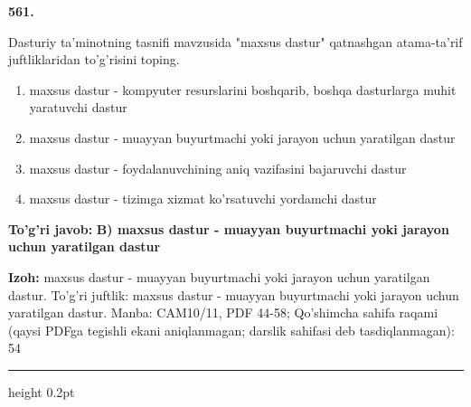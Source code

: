 \documentclass[10pt,a4paper]{article}
\begin{document}
{\bfseries\sffamily\color{ink} 561.}
\par
Dasturiy ta'minotning tasnifi mavzusida "maxsus dastur" qatnashgan atama-ta'rif juftliklaridan to'g'risini toping.
\begin{enumerate}[label=\Alph*),leftmargin=9mm]
\item maxsus dastur - kompyuter resurslarini boshqarib, boshqa dasturlarga muhit yaratuvchi dastur
\item maxsus dastur - muayyan buyurtmachi yoki jarayon uchun yaratilgan dastur
\item maxsus dastur - foydalanuvchining aniq vazifasini bajaruvchi dastur
\item maxsus dastur - tizimga xizmat ko'rsatuvchi yordamchi dastur
\end{enumerate}
\begin{tcolorbox}[enhanced,breakable,colback=teal!4,colframe=teal!60!black,boxrule=0.45pt,arc=1.2mm,left=2.7mm,right=2.7mm,top=1.8mm,bottom=1.8mm,before skip=2mm,after skip=2mm]
{\bfseries\sffamily\color{teal}To'g'ri javob:} \textbf{B) maxsus dastur - muayyan buyurtmachi yoki jarayon uchun yaratilgan dastur}
\par\smallskip
{\bfseries Izoh:} maxsus dastur - muayyan buyurtmachi yoki jarayon uchun yaratilgan dastur. To'g'ri juftlik: maxsus dastur - muayyan buyurtmachi yoki jarayon uchun yaratilgan dastur. Manba: CAM10/11, PDF 44-58; Qo'shimcha sahifa raqami (qaysi PDFga tegishli ekani aniqlanmagan; darslik sahifasi deb tasdiqlanmagan): 54
\end{tcolorbox}
\vspace{2mm}\hrule height 0.2pt\vspace{3mm}
\end{document}
